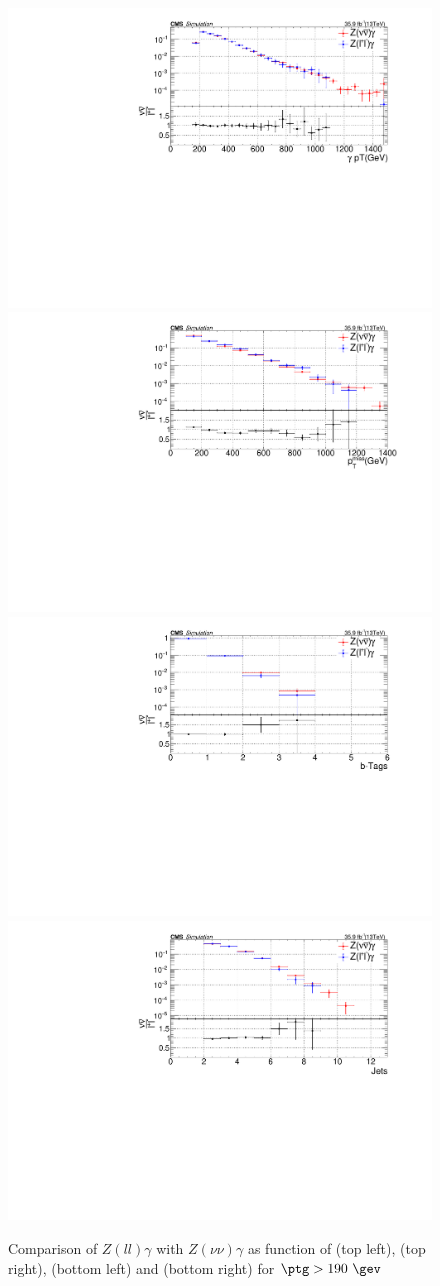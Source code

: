 \begin{figure}[h!]
\centering
\includegraphics[width=0.48\linewidth]{../Figures/Chap3/zgamma/BestPhotonPtNuNu_LL_LO.pdf}
\includegraphics[width=0.48\linewidth]{../Figures/Chap3/zgamma/METNuNu_LL_LO.pdf}\\
\includegraphics[width=0.48\linewidth]{../Figures/Chap3/zgamma/nBTagsNuNu_LL_LO.pdf}
\includegraphics[width=0.48\linewidth]{../Figures/Chap3/zgamma/nHadJetsNuNu_LL_LO.pdf}
\caption{Comparison of $Z(ll)\gamma$ with $Z(\nu\nu)\gamma$ as function of \ptg (top left), \ptmiss (top right), \nb (bottom left) and \nj (bottom right) for $\ptg>190\ \gev$}
\label{fig:ZGTF}
\end{figure}

